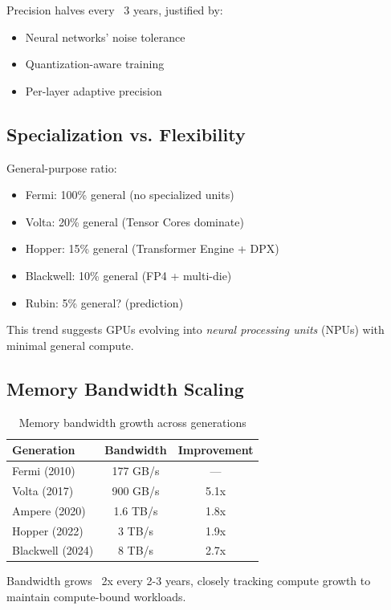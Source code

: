 \documentclass{article}
\begin{document}
Precision halves every ~3 years, justified by:
\begin{itemize}
\item Neural networks' noise tolerance
\item Quantization-aware training
\item Per-layer adaptive precision
\end{itemize}

\subsection{Specialization vs. Flexibility}

General-purpose ratio:
\begin{itemize}
\item Fermi: 100\% general (no specialized units)
\item Volta: 20\% general (Tensor Cores dominate)
\item Hopper: 15\% general (Transformer Engine + DPX)
\item Blackwell: 10\% general (FP4 + multi-die)
\item Rubin: 5\% general? (prediction)
\end{itemize}

This trend suggests GPUs evolving into \textit{neural processing units} (NPUs) with minimal general compute.

\subsection{Memory Bandwidth Scaling}

\begin{table}[h]
\centering
\small
\begin{tabular}{lcc}
\toprule
Generation & Bandwidth & Improvement \\
\midrule
Fermi (2010) & 177 GB/s & — \\
Volta (2017) & 900 GB/s & 5.1x \\
Ampere (2020) & 1.6 TB/s & 1.8x \\
Hopper (2022) & 3 TB/s & 1.9x \\
Blackwell (2024) & 8 TB/s & 2.7x \\
\bottomrule
\end{tabular}
\caption{Memory bandwidth growth across generations}
\end{table}

Bandwidth grows ~2x every 2-3 years, closely tracking compute growth to maintain compute-bound workloads.
\end{document}

